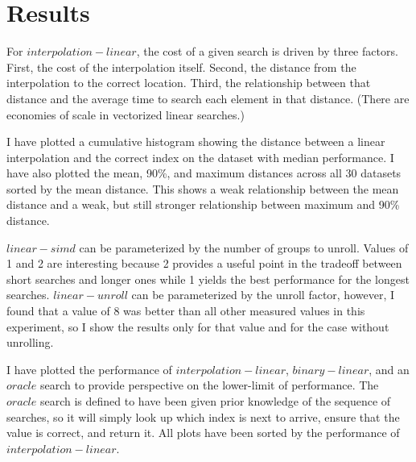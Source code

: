 \documentclass{article}
\begin{document}
\section{Results}
For $interpolation-linear$, the cost of a given search is driven by three factors. First, the cost of the interpolation itself. Second, the distance from the interpolation to the correct location. Third, the relationship between that distance and the average time to search each element in that distance. (There are economies of scale in vectorized linear searches.)

I have plotted a cumulative histogram showing the distance between a linear interpolation and the correct index on the dataset with median performance. I have also plotted the mean, 90\%, and maximum distances across all 30 datasets sorted by the mean distance. This shows a weak relationship between the mean distance and a weak, but still stronger relationship between maximum and 90\% distance.


$linear-simd$ can be parameterized by the number of groups to unroll. Values of 1 and 2 are interesting because 2 provides a useful point in the tradeoff between short searches and longer ones while 1 yields the best performance for the longest searches. $linear-unroll$ can be parameterized by the unroll factor, however, I found that a value of 8 was better than all other measured values in this experiment, so I show the results only for that value and for the case without unrolling.


I have plotted the performance of $interpolation-linear$, $binary-linear$, and an $oracle$ search to provide perspective on the lower-limit of performance. The $oracle$ search is defined to have been given prior knowledge of the sequence of searches, so it will simply look up which index is next to arrive, ensure that the value is correct, and return it. All plots have been sorted by the performance of $interpolation-linear$.
\end{document}
